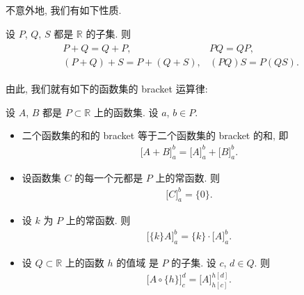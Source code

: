 不意外地, 我们有如下性质.

\begin{theorem}
    设 $P$, $Q$, $S$ 都是 $\mathbb{R}$ 的子集.
    则
    \begin{align*}
        \begin{array}{ll}
            P + Q = Q + P,             & PQ = QP,       \\
            (P + Q) + S = P + (Q + S), & (PQ)S = P(QS).
        \end{array}
    \end{align*}
\end{theorem}


由此, 我们就有如下的函数集的 bracket 运算律:

\begin{theorem}
    设 $A$, $B$ 都是 $P \subset \mathbb{R}$ 上的函数集.
    设 $a$, $b \in P$.
    \begin{itemize}
        \item 二个函数集的和的 bracket
              等于二个函数集的 bracket 的和, 即
              \begin{align*}
                  \big[ A + B \big]_{a}^{b} = \big[ A \big]_{a}^{b} + \big[ B \big]_{a}^{b}.
              \end{align*}
        \item 设函数集 $C$ 的每一个元都是 $P$ 上的常函数.
              则
              \begin{align*}
                  \big[ C \big]_{a}^{b} = \{ 0 \}.
              \end{align*}
        \item 设 $k$ 为 $P$ 上的常函数.
              则
              \begin{align*}
                  \big[ \{ k \} A \big]_{a}^{b} = \{ k \} \cdot \big[ A \big]_{a}^{b}.
              \end{align*}
        \item 设 $Q \subset \mathbb{R}$ 上的函数 $h$ 的值域%
              是 $P$ 的子集.
              设 $c$, $d \in Q$.
              则
              \begin{align*}
                  \big[ A \circ \{ h \} \big]_{c}^{d} = \big[ A \big]_{h[c]}^{h[d]}.
              \end{align*}
    \end{itemize}
\end{theorem}

